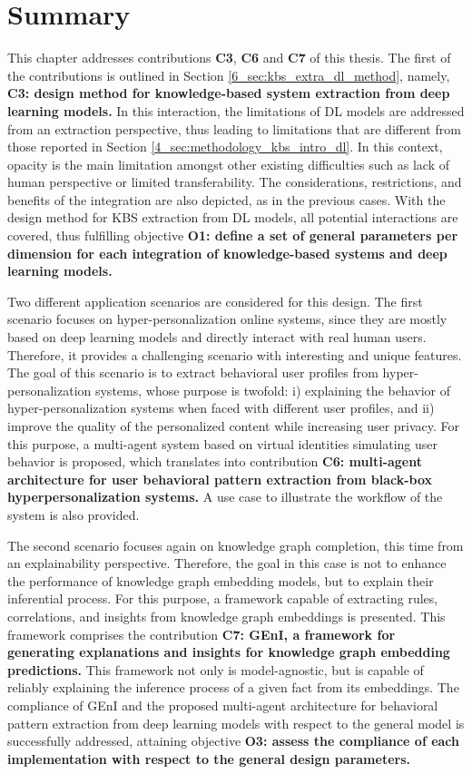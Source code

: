 \section{Summary}\label{6_sec:summary}
This chapter addresses contributions \textbf{C3}, \textbf{C6} and \textbf{C7} of this thesis. The first of the contributions is outlined in Section \ref{6_sec:kbs_extra_dl_method}, namely, \textbf{C3: design method for knowledge-based system extraction from deep learning models.} In this interaction, the limitations of DL models are addressed from an extraction perspective, thus leading to limitations that are different from those reported in Section \ref{4_sec:methodology_kbs_intro_dl}. In this context, opacity is the main limitation amongst other existing difficulties such as lack of human perspective or limited transferability. The considerations, restrictions, and benefits of the integration are also depicted, as in the previous cases. With the design method for KBS extraction from DL models, all potential interactions are covered, thus fulfilling objective \textbf{O1: define a set of general parameters per dimension for each integration of knowledge-based systems and deep learning models.}

Two different application scenarios are considered for this design. The first scenario focuses on hyper-personalization online systems, since they are mostly based on deep learning models and directly interact with real human users. Therefore, it provides a challenging scenario with interesting and unique features. The goal of this scenario is to extract behavioral user profiles from hyper-personalization systems, whose purpose is twofold: i) explaining the behavior of hyper-personalization systems when faced with different user profiles, and ii) improve the quality of the personalized content while increasing user privacy. For this purpose, a multi-agent system based on virtual identities simulating user behavior is proposed, which translates into contribution \textbf{C6: multi-agent architecture for user behavioral pattern extraction from black-box hyperpersonalization systems.} A use case to illustrate the workflow of the system is also provided.

The second scenario focuses again on knowledge graph completion, this time from an explainability perspective. Therefore, the goal in this case is not to enhance the performance of knowledge graph embedding models, but to explain their inferential process. For this purpose, a framework capable of extracting rules, correlations, and insights from knowledge graph embeddings is presented. This framework comprises the contribution \textbf{C7: GEnI, a framework for generating explanations and insights for knowledge graph embedding predictions.} This framework not only is model-agnostic, but is capable of reliably explaining the inference process of a given fact from its embeddings. The compliance of GEnI and the proposed multi-agent architecture for behavioral pattern extraction from deep learning models with respect to the general model is successfully addressed, attaining objective \textbf{O3: assess the compliance of each implementation with respect to the general design parameters.}  

